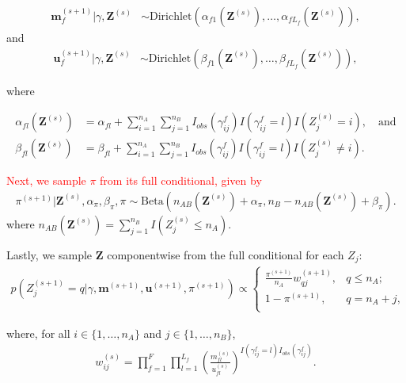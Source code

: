 \documentclass[ba]{imsart}
\begin{document}
\begin{align}
	\bm{m}_f^{(s+1)}|\gamma, \bm{Z}^{(s)} &\sim \text{Dirichlet}(\alpha_{f1}(\bm{Z}^{(s)}), \ldots, \alpha_{fL_f}(\bm{Z}^{(s)})), \label{eqn:m_update}  
\end{align}
and	
\begin{align}
	\bm{u}_f^{(s+1)}|\gamma, \bm{Z}^{(s)} &\sim \text{Dirichlet}(\beta_{f1}(\bm{Z}^{(s)}), \ldots, \beta_{fL_f}(\bm{Z}^{(s)})), \label{eqn:u_update} 
\end{align}	

where

\begin{align}
\alpha_{fl}(\bm{Z}^{(s)})&= \alpha_{fl} + \sum_{i=1}^{n_A}\sum_{j=1}^{n_B} I_{obs}(\gamma_{ij}^f) I(\gamma_{ij}^f = l) I(Z_j^{(s)} = i), \label{eqn:alpha_update} \quad \text{and}\\
\beta_{fl}(\bm{Z}^{(s)})&=  \beta_{fl} + \sum_{i=1}^{n_A}\sum_{j=1}^{n_B}  I_{obs}(\gamma_{ij}^f) I(\gamma_{ij}^f = l) I(Z_j^{(s)} \neq i) \label{eqn:beta_update}.
\end{align}	

\textcolor{red}{Next, we sample $\pi$ from its full conditional, given by}
\begin{align}
\label{eqn:pi}
	\pi^{(s+1)}|\bm{Z}^{(s)},  \alpha_{\pi}, \beta_{\pi}, \pi \sim  \text{Beta}(n_{AB}(\bm{Z}^{(s)}) + \alpha_{\pi}, n_B - n_{AB}(\bm{Z}^{(s)}) + \beta_{\pi}).
\end{align}
where $n_{AB}(\bm{Z}^{(s)}) = \sum_{j=1}^{n_B} I(Z_j^{(s)} \leq n_A)$.

Lastly, we sample $\bm{Z}$ componentwise from the full conditional for each $Z_j$:
\begin{align}
	\label{eqn:z_full_conditional}
	p\left(Z_j^{(s+1)}  = q|\gamma, \bm{m}^{(s+1)}, \bm{u}^{(s+1)},  \pi^{(s+1)}\right) \propto
	\begin{cases} 
		\frac{\pi^{(s+1)}}{n_A} w_{qj}^{(s+1)},  & q \leq n_A; \\
		1 - \pi^{(s+1)}, & q  = n_A + j, \\
	\end{cases}
\end{align}

where, for all $i \in \{1, \ldots, n_A\}$ and $j \in \{1, \ldots, n_B\}$, 
\begin{align}
	\label{eqn:fs_weight}
	w_{ij}^{(s)} = \prod_{f=1}^{F}\prod_{l = 1}^{L_f} \left(\frac{m_{fl}^{(s)}}{u_{fl}^{(s)}}\right)^{I(\gamma_{ij}^f = l)I_{obs}(\gamma_{ij}^f)}.
\end{align}
\end{document}
